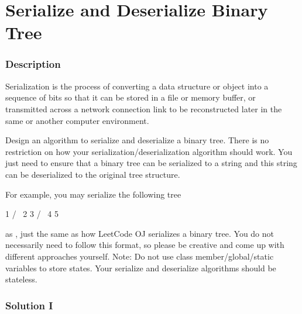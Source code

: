 \newpage

\section{Serialize and Deserialize Binary Tree} %

\subsubsection{Description}
Serialization is the process of converting a data structure or object into a sequence of bits so that it can be stored in a file or memory buffer, or transmitted across a network connection link to be reconstructed later in the same or another computer environment.

Design an algorithm to serialize and deserialize a binary tree. There is no restriction on how your serialization/deserialization algorithm should work. You just need to ensure that a binary tree can be serialized to a string and this string can be deserialized to the original tree structure.

For example, you may serialize the following tree
\begin{Code}
    1
   / \
  2   3
     / \
    4   5
\end{Code}

as , just the same as how LeetCode OJ serializes a binary tree. You do not necessarily need to follow this format, so please be creative and come up with different approaches yourself.
Note: Do not use class member/global/static variables to store states. Your serialize and deserialize algorithms should be stateless.

\newpage

\subsubsection{Solution I}

